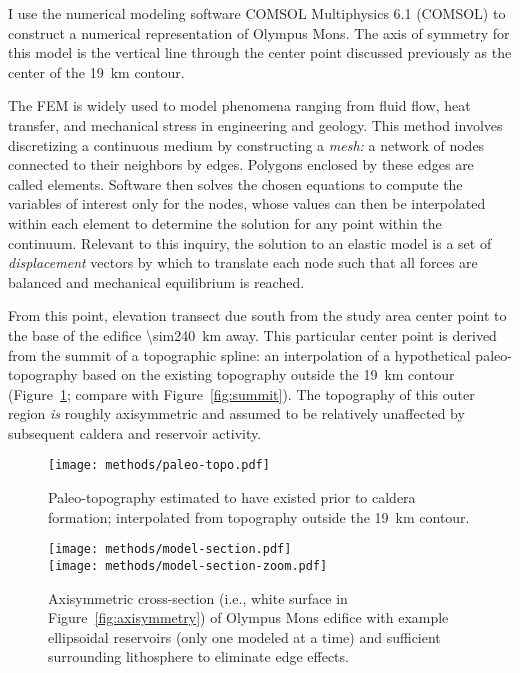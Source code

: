 
I use the numerical modeling software COMSOL Multiphysics 6.1 (COMSOL) to construct a numerical representation of Olympus Mons. The axis of symmetry for this model is the vertical line through the center point discussed previously as the center of the \qty{19}{\km} contour.

The \ac{FEM} is widely used to model phenomena ranging from fluid flow, heat transfer, and mechanical stress in engineering and geology. This method involves discretizing a continuous medium by constructing a \emph{mesh:} a network of nodes connected to their neighbors by edges. Polygons enclosed by these edges are called elements. Software then solves the chosen equations to compute the variables of interest only for the nodes, whose values can then be interpolated within each element to determine the solution for any point within the continuum. Relevant to this inquiry, the solution to an elastic model is a set of \emph{displacement} vectors by which to translate each node such that all forces are balanced and mechanical equilibrium is reached.

From this point, elevation transect due south from the study area center point to the base of the edifice \qty{\sim240}{\km} away. This particular center point is derived from the summit of a topographic spline: an interpolation of a hypothetical paleo-topography based on the existing topography outside the \qty{19}{\km} contour (Figure~\ref{fig:paleo-topo}; compare with Figure~\ref{fig:summit}). The topography of this outer region \emph{is} roughly axisymmetric and assumed to be relatively unaffected by subsequent caldera and reservoir activity.

\begin{figure}
    \texttt{[image: methods/paleo-topo.pdf]}
    \caption[Spline-derived paleo-topography]{Paleo-topography estimated to have existed prior to caldera formation; interpolated from topography outside the \qty{19}{\km} contour.}%
    \label{fig:paleo-topo}
\end{figure}

\begin{figure}
    \texttt{[image: methods/model-section.pdf]}\\
    \texttt{[image: methods/model-section-zoom.pdf]}%
    \caption[Axisymmetric numerical model section]{Axisymmetric cross-section (i.e., white surface in Figure~\ref{fig:axisymmetry}) of Olympus Mons edifice with example ellipsoidal reservoirs (only one modeled at a time) and sufficient surrounding lithosphere to eliminate edge effects.}%
    \label{fig:model-section}
\end{figure}


